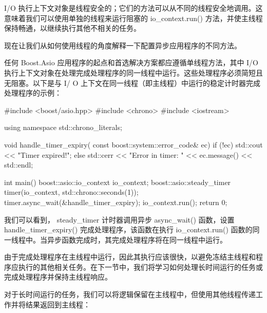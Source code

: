 

I/O 执行上下文对象是线程安全的；它们的方法可以从不同的线程安全地调用。这意味着我们可以使用单独的线程来运行阻塞的 io\_context.run() 方法，并使主线程保持畅通，以继续执行其他不相关的任务。

现在让我们从如何使用线程的角度解释一下配置异步应用程序的不同方法。


任何 Boost.Asio 应用程序的起点和首选解决方案都应遵循单线程方法，其中 I/O 执行上下文对象在处理完成处理程序的同一线程中运行。这些处理程序必须简短且无阻塞。以下是与 I/ O 上下文在同一线程（即主线程）中运行的稳定计时器完成处理程序的示例：

\begin{cpp}
#include <boost/asio.hpp>
#include <chrono>
#include <iostream>

using namespace std::chrono_literals;

void handle_timer_expiry(
            const boost::system::error_code& ec) {
    if (!ec) {
        std::cout << "Timer expired!\n";
    } else {
        std::cerr << "Error in timer: "
                  << ec.message() << std::endl;
    }
}

int main() {
    boost::asio::io_context io_context;
    boost::asio::steady_timer timer(io_context,
                              std::chrono::seconds(1));
    timer.async_wait(&handle_timer_expiry);
    io_context.run();
    return 0;
}
\end{cpp}

我们可以看到， steady\_timer 计时器调用异步 async\_wait() 函数，设置 handle\_timer\_expiry() 完成处理程序，该函数在执行 io\_context.run() 函数的同一线程中。当异步函数完成时，其完成处理程序将在同一线程中运行。

由于完成处理程序在主线程中运行，因此其执行应该很快，以避免冻结主线程和程序应执行的其他相关任务。在下一节中，我们将学习如何处理长时间运行的任务或完成处理程序并保持主线程响应。


对于长时间运行的任务，我们可以将逻辑保留在主线程中，但使用其他线程传递工作并将结果返回到主线程：

